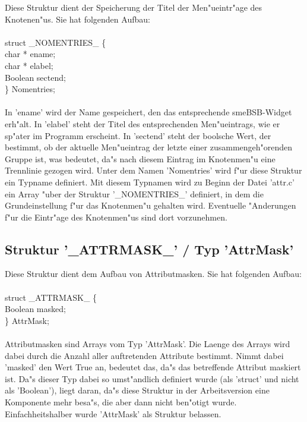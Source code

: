 Diese Struktur dient der Speicherung der Titel der Men"ueintr"age des Knotenen"us. Sie hat folgenden Aufbau:\\ 
\\
struct \_NOMENTRIES\_ \{\\
\hspace*{1em}   char *  ename;\\
\hspace*{1em}   char *  elabel;\\
\hspace*{1em}   Boolean sectend;\\
\} Nomentries;\\
\\
In 'ename' wird der Name gespeichert, den das entsprechende smeBSB-Widget erh"alt. In 'elabel' steht der Titel des entsprechenden Men"ueintrags, wie er sp"ater im Programm erscheint. In 'sectend' steht der boolsche Wert, der bestimmt, ob der aktuelle Men"ueintrag der letzte einer zusammengeh"orenden Gruppe ist, was bedeutet, da"s nach diesem Eintrag im Knotenmen"u eine Trennlinie gezogen wird. Unter dem Namen 'Nomentries' wird f"ur diese Struktur ein Typname definiert. Mit diesem Typnamen wird zu Beginn der Datei 'attr.c' ein Array "uber der Struktur '\_NOMENTRIES\_' definiert, in dem die Grundeinstellung f"ur das Knotenmen"u gehalten wird. Eventuelle "Anderungen f"ur die Eintr"age des Knotenmen"us sind dort vorzunehmen.

\subsection{Struktur '\_ATTRMASK\_' / Typ 'AttrMask'}

Diese Struktur dient dem Aufbau von Attributmasken. Sie hat folgenden Aufbau:\\
\\
struct \_ATTRMASK\_ \{\\
\hspace*{1em}   Boolean masked;\\
\} AttrMask;\\
\\
Attributmasken sind Arrays vom Typ 'AttrMask'. Die Laenge des Arrays wird dabei durch die Anzahl aller auftretenden Attribute bestimmt. Nimmt dabei 'masked' den Wert True an, bedeutet das, da"s das betreffende Attribut maskiert ist. Da"s dieser Typ dabei so umst"andlich definiert wurde (als 'struct' und nicht als 'Boolean'), liegt daran, da"s diese Struktur in der Arbeitsversion eine Komponente mehr besa"s, die aber dann nicht ben"otigt wurde. Einfachheitshalber wurde 'AttrMask' als Struktur belassen.

